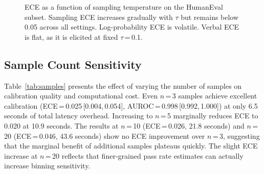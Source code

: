 \documentclass{article}
\begin{document}
\begin{figure}[t]
\centering
{}
\caption{ECE as a function of sampling temperature on the HumanEval subset. Sampling ECE increases gradually with $\tau$ but remains below 0.05 across all settings. Log-probability ECE is volatile. Verbal ECE is flat, as it is elicited at fixed $\tau$\,=\,0.1.}
\label{fig:temp_ece}
\vspace{-0.5em}
\end{figure}

\subsection{Sample Count Sensitivity}
\label{sec:sample_count}

Table~\ref{tab:samples} presents the effect of varying the number of samples on calibration quality and computational cost. Even $n$\,=\,3 samples achieve excellent calibration (ECE\,=\,0.025\,[0.004,\,0.054], AUROC\,=\,0.998\,[0.992,\,1.000]) at only 6.5 seconds of total latency overhead. Increasing to $n$\,=\,5 marginally reduces ECE to 0.020 at 10.9 seconds. The results at $n$\,=\,10 (ECE\,=\,0.026, 21.8 seconds) and $n$\,=\,20 (ECE\,=\,0.046, 43.6 seconds) show no ECE improvement over $n$\,=\,3, suggesting that the marginal benefit of additional samples plateaus quickly. The slight ECE increase at $n$\,=\,20 reflects that finer-grained pass rate estimates can actually increase binning sensitivity.
\end{document}
